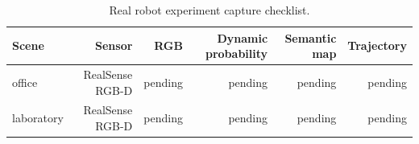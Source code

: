 \begin{table}[t]
\centering
\caption{Real robot experiment capture checklist.}
\label{tab:real_robot_manifest}
\begin{tabular}{lrrrrr}
\toprule
Scene & Sensor & RGB & Dynamic probability & Semantic map & Trajectory \\
\midrule
office & RealSense RGB-D & pending & pending & pending & pending \\
laboratory & RealSense RGB-D & pending & pending & pending & pending \\
\bottomrule
\end{tabular}
\end{table}
